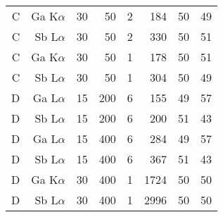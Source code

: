 \begin{table}[phtb]
\begin{center}
\begin{tabular}{rrrrrrrr}
            C               & Ga K$\alpha$  & 30             & 50             & 2           & 184                & 50                   & 49                             \\
            C               & Sb L$\alpha$  & 30             & 50             & 2           & 330                & 50                   & 51                             \\
            C               & Ga K$\alpha$  & 30             & 50             & 1           & 178                & 50                   & 51                             \\
            C               & Sb L$\alpha$  & 30             & 50             & 1           & 304                & 50                   & 49                             \\
            \hline
            D               & Ga L$\alpha$  & 15             & 200            & 6           & 155                & 49                   & 57                             \\
            D               & Sb L$\alpha$  & 15             & 200            & 6           & 200                & 51                   & 43                             \\
            D               & Ga L$\alpha$  & 15             & 400            & 6           & 284                & 49                   & 57                             \\
            D               & Sb L$\alpha$  & 15             & 400            & 6           & 367                & 51                   & 43                             \\
            D               & Ga K$\alpha$  & 30             & 400            & 1           & 1724               & 50                   & 50                             \\
            D               & Sb L$\alpha$  & 30             & 400            & 1           & 2996               & 50                   & 50                             \\
            \hline
        \end{tabular}
    \end{center}
\end{table}
\restoregeometry %